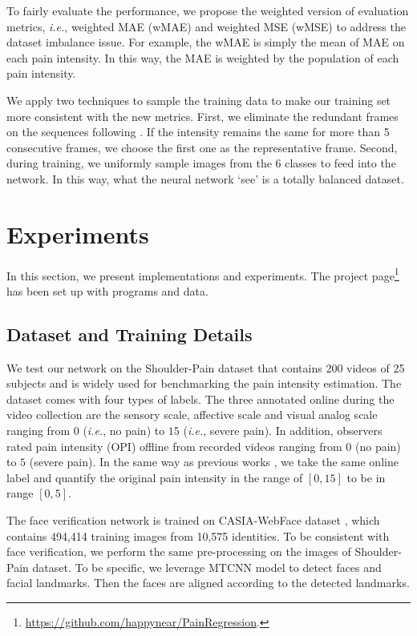 \documentclass{article}
\begin{document}
To fairly evaluate the performance, we propose the weighted version of evaluation metrics, \emph{i.e.}, weighted MAE (wMAE) and weighted MSE (wMSE) to address the dataset imbalance issue.
For example, the wMAE is simply the mean of MAE on each pain intensity.
In this way, the MAE is weighted by the population of each pain intensity.

We apply two techniques to sample the training data to make our training set more consistent with the new metrics.
First, we eliminate the redundant frames on the sequences following \cite{Zhao_2016_CVPR}. 
If the intensity remains the same for more than 5 consecutive frames, we choose the first one as the representative frame.
Second, during training, we uniformly sample images from the 6 classes to feed into the network. In this way, what the neural network `see' is a totally balanced dataset.

\section{Experiments} \label{sec:exp}
\vspace{-1mm}
In this section, we present implementations and experiments. 
The project page\footnote{\url{https://github.com/happynear/PainRegression}.} has been set up with programs and data.
\vspace{-2mm}
\subsection{Dataset and Training Details}
\vspace{-2mm}
We test our network on the Shoulder-Pain dataset \cite{lucey2011painful} that contains 200 videos of 25 subjects and is widely used for benchmarking the pain intensity estimation.
The dataset comes with four types of labels. The three annotated online during the video collection are the sensory scale, affective scale and visual analog scale ranging from $0$ (\emph{i.e.}, no pain) to $15$ (\emph{i.e.}, severe pain). 
In addition, observers rated pain intensity (OPI) offline from recorded videos ranging from $0$ (no pain) to $5$ (severe pain).
In the same way as previous works \cite{Zhao_2016_CVPR, zhou2016recurrent, rudovic2013automatic}, we take the same online label and  quantify the original pain intensity in the range of $[0, 15]$ to be in range $[0, 5]$.

The face verification network \cite{wen2016discriminative} is trained on CASIA-WebFace dataset \cite{yi2014learning}, which contains 494,414 training images from 10,575 identities. To be consistent with face verification, we perform the same pre-processing on the images of Shoulder-Pain dataset. To be specific, we leverage MTCNN model \cite{MTCNN} to detect faces and facial landmarks. Then the faces are aligned according to the detected landmarks.
\end{document}
